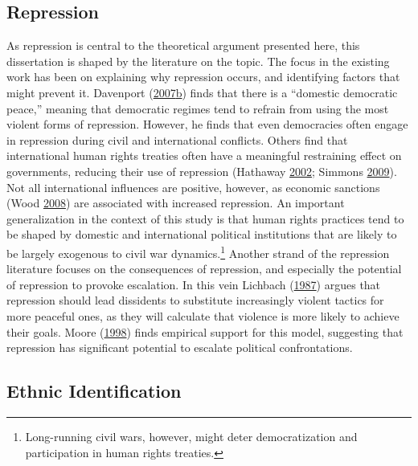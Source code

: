 \documentclass[12pt,]{book}
\let\rmarkdownfootnote\footnote%
\def\footnote{\protect\rmarkdownfootnote}
\theoremstyle{definition}
\theoremstyle{definition}
\theoremstyle{definition}
\theoremstyle{remark}
\begin{document}
\hypertarget{repression}{%
\subsection{Repression}\label{repression}}

As repression is central to the theoretical argument presented here,
this dissertation is shaped by the literature on the topic. The focus in
the existing work has been on explaining why repression occurs, and
identifying factors that might prevent it. Davenport
(\protect\hyperlink{ref-Davenport2007a}{2007}\protect\hyperlink{ref-Davenport2007a}{b})
finds that there is a ``domestic democratic peace,'' meaning that
democratic regimes tend to refrain from using the most violent forms of
repression. However, he finds that even democracies often engage in
repression during civil and international conflicts. Others find that
international human rights treaties often have a meaningful restraining
effect on governments, reducing their use of repression (Hathaway
\protect\hyperlink{ref-Hathaway2002}{2002}; Simmons
\protect\hyperlink{ref-simmons09}{2009}). Not all international
influences are positive, however, as economic sanctions (Wood
\protect\hyperlink{ref-Wood2008a}{2008}) are associated with increased
repression. An important generalization in the context of this study is
that human rights practices tend to be shaped by domestic and
international political institutions that are likely to be largely
exogenous to civil war dynamics.\footnote{Long-running civil wars,
  however, might deter democratization and participation in human rights
  treaties.} Another strand of the repression literature focuses on the
consequences of repression, and especially the potential of repression
to provoke escalation. In this vein Lichbach
(\protect\hyperlink{ref-Lichbach1987}{1987}) argues that repression
should lead dissidents to substitute increasingly violent tactics for
more peaceful ones, as they will calculate that violence is more likely
to achieve their goals. Moore (\protect\hyperlink{ref-Moore1998}{1998})
finds empirical support for this model, suggesting that repression has
significant potential to escalate political confrontations.

\hypertarget{ethnic-identification}{%
\subsection{Ethnic Identification}\label{ethnic-identification}}
\end{document}
